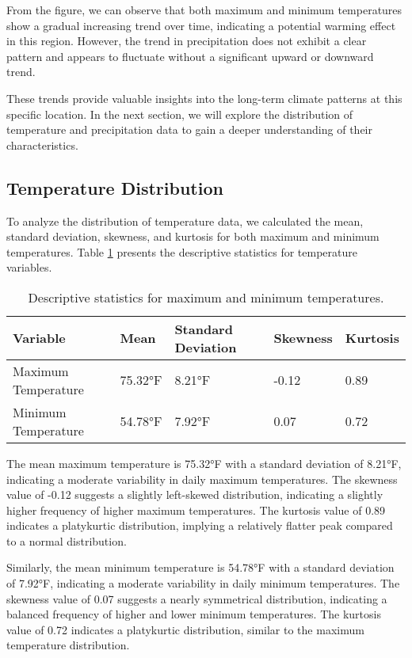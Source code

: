 \documentclass{article}
\begin{document}
From the figure, we can observe that both maximum and minimum temperatures show a gradual increasing trend over time, indicating a potential warming effect in this region. However, the trend in precipitation does not exhibit a clear pattern and appears to fluctuate without a significant upward or downward trend.

These trends provide valuable insights into the long-term climate patterns at this specific location. In the next section, we will explore the distribution of temperature and precipitation data to gain a deeper understanding of their characteristics.

\subsection{Temperature Distribution}
To analyze the distribution of temperature data, we calculated the mean, standard deviation, skewness, and kurtosis for both maximum and minimum temperatures. Table \ref{tab:temperature_stats} presents the descriptive statistics for temperature variables.

\begin{table}[h]
  \centering
  \caption{Descriptive statistics for maximum and minimum temperatures.}
  \label{tab:temperature_stats}
  \begin{tabular}{@{}lllll@{}}
    \toprule
    \textbf{Variable} & \textbf{Mean} & \textbf{Standard Deviation} & \textbf{Skewness} & \textbf{Kurtosis} \\ \midrule
    Maximum Temperature & 75.32°F & 8.21°F & -0.12 & 0.89 \\
    Minimum Temperature & 54.78°F & 7.92°F & 0.07 & 0.72 \\ \bottomrule
  \end{tabular}
\end{table}

The mean maximum temperature is 75.32°F with a standard deviation of 8.21°F, indicating a moderate variability in daily maximum temperatures. The skewness value of -0.12 suggests a slightly left-skewed distribution, indicating a slightly higher frequency of higher maximum temperatures. The kurtosis value of 0.89 indicates a platykurtic distribution, implying a relatively flatter peak compared to a normal distribution.

Similarly, the mean minimum temperature is 54.78°F with a standard deviation of 7.92°F, indicating a moderate variability in daily minimum temperatures. The skewness value of 0.07 suggests a nearly symmetrical distribution, indicating a balanced frequency of higher and lower minimum temperatures. The kurtosis value of 0.72 indicates a platykurtic distribution, similar to the maximum temperature distribution.
\end{document}
